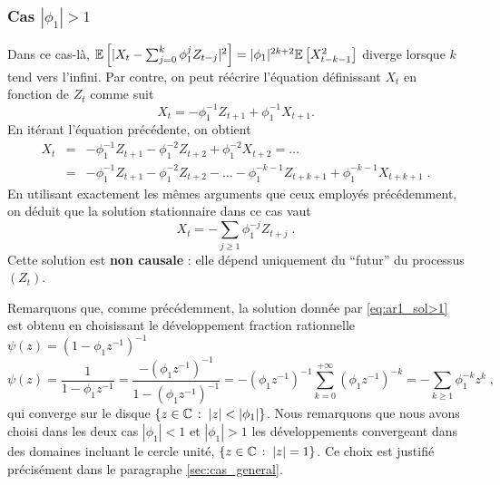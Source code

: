 \subsubsection{Cas $|\phi_1| > 1$}
Dans ce cas-l\`a, ${\mathbb E}\left[ |X_t-\sum_{j=0}^{k}\phi_1^j
Z_{t-j}|^2 \right] = |\phi_1|^{2k+2} {\mathbb E}\left[ X_{t-k-1}^2 \right]$ diverge
lorsque $k$ tend vers l'infini. Par contre, on peut
r\'e\'ecrire l'\'equation d\'efinissant $X_t$ en fonction de $Z_t$ comme suit
$$
X_t=-\phi_1^{-1} Z_{t+1}+\phi_1^{-1} X_{t+1}.
$$
En it\'erant l'\'equation pr\'ec\'edente, on obtient
\begin{eqnarray*}
X_t&=&-\phi_1^{-1} Z_{t+1}-\phi_1^{-2} Z_{t+2}+\phi_1^{-2} X_{t+2}=\dots\\
&=&-\phi_1^{-1} Z_{t+1}-\phi_1^{-2} Z_{t+2}-\dots-\phi_1^{-k-1}
Z_{t+k+1}+\phi_1^{-k-1} X_{t+k+1}\; .
\end{eqnarray*}
En utilisant exactement les m\^{e}mes arguments que ceux employ\'es
pr\'ec\'edemment, on d\'eduit que la solution stationnaire dans ce cas vaut
\begin{equation}
\label{eq:ar1_sol>1}
X_t=-\sum_{j\geq 1} \phi_1^{-j} Z_{t+j}\; .
\end{equation}
Cette solution est  \textbf{non causale} : elle d\'epend
uniquement du ``futur'' du processus $(Z_t)$.

Remarquons que, comme pr\'ec\'edemment, la solution donn\'ee par \eqref{eq:ar1_sol>1} est obtenu
en choisissant le d\'eveloppement fraction rationnelle $\psi(z)=(1-\phi_1
z^{-1})^{-1}$
\[
  \psi(z)=\frac{1}{1-\phi_1 z^{-1}} = \frac{-(\phi_1 z^{-1})^{-1}}{1-(\phi_1
    z^{-1})^{-1}}=-(\phi_1 z^{-1})^{-1}\sum_{k=0}^{+\infty} (\phi_1 z^{-1})^{-k}
=-\sum_{k\geq 1}\phi_1^{-k} z^{k}\;,
\]
qui converge sur le disque $ \left\{ z \in \mathbb{C}\,:\; |z| < |\phi_1|\right\}$. Nous remarquons que
nous avons choisi dans les deux cas $|\phi_1| < 1$ et $|\phi_1| > 1$ les d\'eveloppements convergeant
dans des domaines incluant le cercle unit\'e, $\left\{ z \in \mathbb{C}\,:\;  |z|=1 \right\}$.
Ce choix est justifié pr\'ecis\'ement dans le paragraphe \ref{sec:cas_general}.

